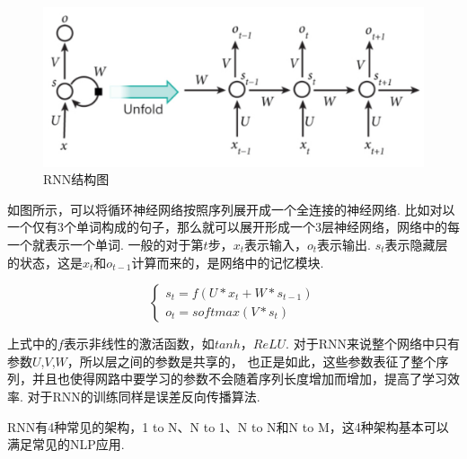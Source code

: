 \documentclass[bachelor,adobefonts]{jnuthesis}
\begin{document}
\begin{figure}[h!]
  \centering
  \includegraphics[width=0.6\linewidth]{RNN.png}
  \caption{RNN结构图}
\end{figure}

如图所示，可以将循环神经网络按照序列展开成一个全连接的神经网络.
比如对以一个仅有3个单词构成的句子，那么就可以展开形成一个3层神经网络，网络中的每一个就表示一个单词.
一般的对于第$t$步，$x_{t}$表示输入，$o_{t}$表示输出.
$s_{t}$表示隐藏层的状态，这是$x_{t}$和$o_{t-1}$计算而来的，是网络中的记忆模块.

\begin{equation}
  \left\{
  \begin{array}{l}
    s_{t} = f(U*x_{t}+W*s_{t-1}) \\
    o_{t} = softmax(V*s_{t})
  \end{array}
  \right.
\end{equation}

上式中的$f$表示非线性的激活函数，如$tanh$，$ReLU$.
对于RNN来说整个网络中只有参数$U$,$V$,$W$，所以层之间的参数是共享的，
也正是如此，这些参数表征了整个序列，并且也使得网路中要学习的参数不会随着序列长度增加而增加，提高了学习效率.
对于RNN的训练同样是误差反向传播算法.

RNN有4种常见的架构，1 to N、N to 1、N to N和N to M，这4种架构基本可以满足常见的NLP应用.


\end{document}
